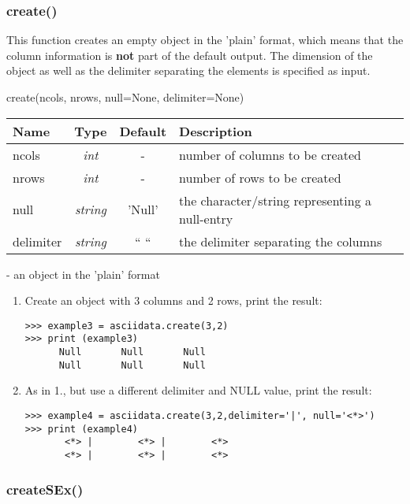 \subsubsection{create()}
\label{functions_create}

This function creates an empty \ad object in the 'plain' format, which means
that the column information is {\bf not} part of the default output.
The dimension of the \ad object as well as the delimiter separating
the elements is specified as input.

create(ncols, nrows, null=None, delimiter=None)

\begin{tabular}{lccl}
Name     & Type    & Default & Description \\ \hline
ncols    &{\it int}& - & number of columns to be created\\
nrows    &{\it int}& - & number of rows to be created\\
null     &{\it string}& 'Null' & the character/string representing a null-entry\\
delimiter&{\it string}& `` `` & the delimiter separating the columns \\
\end{tabular}

- an \ad object in the 'plain' format

\begin{enumerate}
\item Create an \ad object with 3 columns and 2 rows, print the result:
\begin{verbatim}
>>> example3 = asciidata.create(3,2)
>>> print (example3)
      Null       Null       Null
      Null       Null       Null
\end{verbatim}

\item As in 1., but use a different delimiter and NULL value, print the result:
\begin{verbatim}
>>> example4 = asciidata.create(3,2,delimiter='|', null='<*>')
>>> print (example4)
       <*> |        <*> |        <*>
       <*> |        <*> |        <*>
\end{verbatim}
\end{enumerate}


\subsubsection{createSEx()}
\label{functions_createSEx}

